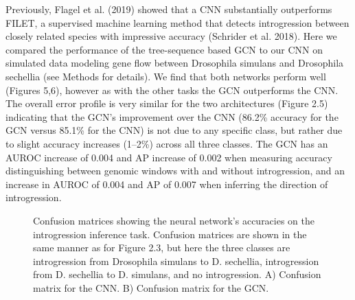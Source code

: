Previously, Flagel et al. (2019) showed that a CNN substantially outperforms FILET, a supervised machine learning method that detects introgression between closely related species with impressive accuracy (Schrider et al. 2018). Here we compared the performance of the tree-sequence based GCN to our CNN on simulated data modeling gene flow between Drosophila simulans and Drosophila sechellia (see Methods for details). We find that both networks perform well (Figures 5,6), however as with the other tasks the GCN outperforms the CNN. The overall error profile is very similar for the two architectures (Figure 2.5) indicating that the GCN's improvement over the CNN (86.2\% accuracy for the GCN versus 85.1\% for the CNN) is not due to any specific class, but rather due to slight accuracy increases (1–2\%) across all three classes. The GCN has an AUROC increase of 0.004 and AP increase of 0.002 when measuring accuracy distinguishing between genomic windows with and without introgression, and an increase in AUROC of 0.004 and AP of 0.007 when inferring the direction of introgression.


\begin{figure}
    \centering
    \caption[Confusion matrices showing the neural network’s accuracies on the introgression inference task]{Confusion matrices showing the neural network’s accuracies on the introgression inference task. Confusion matrices are shown in the same manner as for Figure 2.3, but here the three classes are introgression from Drosophila simulans to D. sechellia, introgression from D. sechellia to D. simulans, and no introgression. A) Confusion matrix for the CNN. B) Confusion matrix for the GCN.}
    \label{fig:enter-label}
\end{figure}

